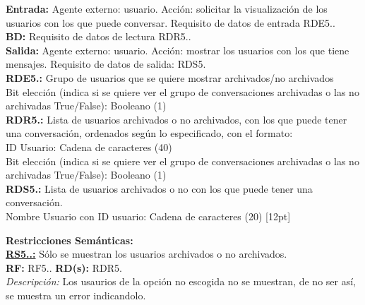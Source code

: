 \textbf{\textcolor{rojo}{Entrada:}} Agente externo: usuario. Acción: solicitar la visualización de los usuarios con los que puede conversar. 
Requisito de datos de entrada \textcolor{azul}{RDE5.\theRDE}. \\[6pt]

\textbf{\textcolor{rojo}{BD:}} Requisito de datos de lectura \textcolor{azul}{RDR5.\theRDR}. \\[6pt]

\textbf{\textcolor{rojo}{Salida:}} Agente externo: usuario. Acción: mostrar los usuarios con los que tiene mensajes. 
Requisito de datos de salida: \textcolor{azul}{RDS5.\theRDS} \\[12pt]

\textcolor{azul}{\textbf{RDE5.\theRDE:}} Grupo de usuarios que se quiere mostrar archivados/no archivados\\
\hspace*{1cm} Bit elección (indica si se quiere ver el grupo de conversaciones archivadas o las no archivadas True/False): Booleano (1) \\[12pt]

\textcolor{azul}{\textbf{RDR5.\theRDR:}} Lista de usuarios archivados o no archivados, con los que puede tener una conversación, ordenados según lo especificado, con el formato:\\
\hspace*{1cm} ID Usuario: Cadena de caracteres (40) \\
\hspace*{1cm} Bit elección (indica si se quiere ver el grupo de conversaciones archivadas o las no archivadas True/False): Booleano (1) \\[12pt]

\textcolor{azul}{\textbf{RDS5.\theRDS:}} Lista de usuarios archivados o no con los que puede tener una conversación. \\
\hspace*{1cm} Nombre Usuario con ID usuario: Cadena de caracteres (20) [12pt]

\setcounter{RS}{1}
\textbf{\textcolor{verde}{Restricciones Semánticas:}} \\[6pt]
\textbf{\textcolor{verde}{\underline{RS5.\theRF.\theRS:}}} Sólo se muestran los usuarios archivados o no archivados. \\
\textbf{RF:} RF5.\theRF. \textbf{RD(s):} RDR5.\theRDR \\
\hspace*{1cm} \textit{Descripción:} Los usaurios de la opción no escogida no se muestran, de no ser así, se muestra un error indicandolo. \\ [6pt]

